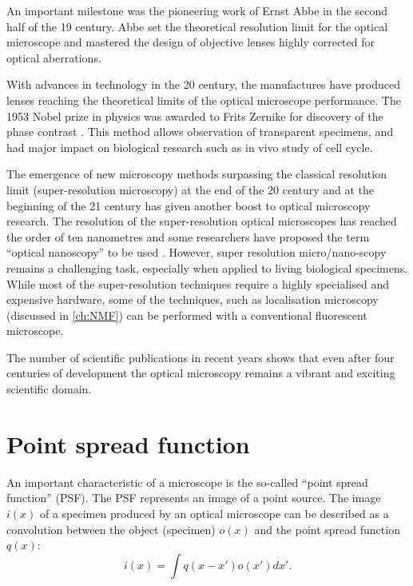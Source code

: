 An important milestone was the pioneering work of Ernst Abbe \cite{Abbe1873} in the second half of the 19\ths{} century. Abbe set the theoretical resolution limit for the optical microscope and mastered the design of objective lenses highly corrected for optical aberrations.

With advances in technology in the 20\ths{} century, the manufactures have produced lenses reaching the theoretical limits of the optical microscope performance. The 1953 Nobel prize in physics was awarded to Frits Zernike for discovery of the phase contrast \cite{Zernike1942}. This method allows observation of transparent specimens, and had major impact on biological research such as in vivo study of cell cycle. 

The emergence of new microscopy methods surpassing the classical resolution limit (super-resolution microscopy) at the end of the 20\ths{} century and at the beginning of the 21\st{} century has given another boost to optical microscopy research. The resolution of the super-resolution optical microscopes has reached the order of ten nanometres and some researchers have proposed the term ``optical nanoscopy'' to be used \cite{Egner2007, Hell2007, Hell2009}. However, super resolution micro/nano-scopy remains a challenging task, especially when applied to living biological specimens. While most of the super-resolution techniques require a highly specialised and expensive hardware, some of the techniques, such as localisation microscopy (discussed in \autoref{ch:NMF}) can be performed with a conventional fluorescent microscope. 

The number of scientific publications in recent years shows that even after four centuries of development the optical microscopy remains a vibrant and exciting scientific domain.


\section{Point spread function\label{sec:PSF}}

An important characteristic of a microscope is the so-called ``point spread function'' (PSF). The PSF represents an image of a point source. The image $i(x)$ of a specimen produced by an optical microscope can be described as a convolution between the object (specimen) $o(x)$ and the point spread function $q(x)$:
%
\begin{equation}
	i(x)=\int q(x-x')o(x')dx'.
	\label{eq:conv}
\end{equation}  

